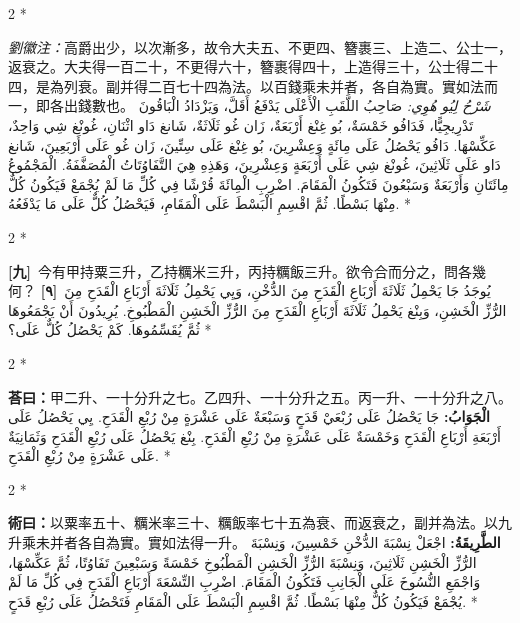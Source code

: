 \documentclass[11pt,a4paper]{article}
\newcommand{\ar}[1]{\arabicfont\beginR #1\endR}
\newcommand{\problemnum}[1]{\textbf{[\ignorespaces#1\unskip]}}
\newenvironment{bilingual}{%
  \begin{paracol}{2}%
  \switchcolumn[0]*%
}{%
  \end{paracol}%
}
\newcommand{\cnline}[1]{\switchcolumn[0]\noindent #1 \switchcolumn[1]}
\newcommand{\arline}[1]{\noindent\ar{#1} \switchcolumn[0]*}
\newenvironment{prob bilingual}{%
  \begin{paracol}{2}%
  \switchcolumn[0]*%
}{%
  \end{paracol}%
  \vspace{0.3em}%
}
\begin{document}
\begin{bilingual}
\cnline{%
\textcolor{commentarycolor}{\small\textit{劉徽注：}}高爵出少，以次漸多，故令大夫五、不更四、簪裹三、上造二、公士一，返衰之。大夫得一百二十，不更得六十，簪裹得四十，上造得三十，公士得二十四，是為列衰。副并得二百七十四為法。以百錢乘未并者，各自為實。實如法而一，即各出錢數也。
}
\arline{%
\textcolor{commentarycolor}{\small\textit{شَرْحُ لِيُو هُوِي:}} صَاحِبُ اللَّقَبِ الْأَعْلَى يَدْفَعُ أَقَلَّ، وَيَزْدَادُ الْبَاقُونَ تَدْرِيجِيًّا، فَدَافُو خَمْسَةٌ، بُو غِنْغ أَرْبَعَةٌ، زَان غُو ثَلَاثَةٌ، شَانغ دَاو اثْنَانِ، غُونْغ شِي وَاحِدٌ، عَكِّسْهَا. دَافُو يَحْصُلُ عَلَى مِائَةٍ وَعِشْرِينَ، بُو غِنْغ عَلَى سِتِّينَ، زَان غُو عَلَى أَرْبَعِينَ، شَانغ دَاو عَلَى ثَلَاثِينَ، غُونْغ شِي عَلَى أَرْبَعَةٍ وَعِشْرِينَ، وَهَذِهِ هِيَ التَّفَاوُتَاتُ الْمُصَفَّفَةُ. الْمَجْمُوعُ مِائَتَانِ وَأَرْبَعَةٌ وَسَبْعُونَ فَتَكُونُ الْمَقَامَ. اضْرِبِ الْمِائَةَ قُرْشًا فِي كُلِّ مَا لَمْ يُجْمَعْ فَيَكُونُ كُلٌّ مِنْهَا بَسْطًا. ثُمَّ اقْسِمِ الْبَسْطَ عَلَى الْمَقَامِ، فَيَحْصُلُ كُلٌّ عَلَى مَا يَدْفَعُهُ.
}
\end{bilingual}

\begin{bilingual}
\cnline{\problemnum{九}\, 今有甲持粟三升，乙持糲米三升，丙持糲飯三升。欲令合而分之，問各幾何？}
\arline{\problemnum{٩}\, يُوجَدُ جَا يَحْمِلُ ثَلَاثَةَ أَرْبَاعِ الْقَدَحِ مِنَ الدُّخْنِ، وَيِي يَحْمِلُ ثَلَاثَةَ أَرْبَاعِ الْقَدَحِ مِنَ الرُّزِّ الْخَشِنِ، وَبِنْغ يَحْمِلُ ثَلَاثَةَ أَرْبَاعِ الْقَدَحِ مِنَ الرُّزِّ الْخَشِنِ الْمَطْبُوخِ. يُرِيدُونَ أَنْ يَجْمَعُوهَا ثُمَّ يُقَسِّمُوهَا. كَمْ يَحْصُلُ كُلٌّ عَلَى؟}
\end{bilingual}

\begin{bilingual}
\cnline{\textcolor{answercolor}{\textbf{荅曰：}}甲二升、一十分升之七。乙四升、一十分升之五。丙一升、一十分升之八。}
\arline{\textcolor{answercolor}{\textbf{الْجَوَابُ:}} جَا يَحْصُلُ عَلَى رُبْعَيْ قَدَحٍ وَسَبْعَةٌ عَلَى عَشْرَةٍ مِنْ رُبْعِ الْقَدَحِ. يِي يَحْصُلُ عَلَى أَرْبَعَةِ أَرْبَاعِ الْقَدَحِ وَخَمْسَةٌ عَلَى عَشْرَةٍ مِنْ رُبْعِ الْقَدَحِ. بِنْغ يَحْصُلُ عَلَى رُبْعِ الْقَدَحِ وَثَمَانِيَةٌ عَلَى عَشْرَةٍ مِنْ رُبْعِ الْقَدَحِ.}
\end{bilingual}

\begin{bilingual}
\cnline{%
\textcolor{methodcolor}{\textbf{術曰：}}以粟率五十、糲米率三十、糲飯率七十五為衰、而返衰之，副并為法。以九升乘未并者各自為實。實如法得一升。
}
\arline{%
\textcolor{methodcolor}{\textbf{الطَّرِيقَةُ:}} اجْعَلْ نِسْبَةَ الدُّخْنِ خَمْسِينَ، وَنِسْبَةَ الرُّزِّ الْخَشِنِ ثَلَاثِينَ، وَنِسْبَةَ الرُّزِّ الْخَشِنِ الْمَطْبُوخِ خَمْسَةً وَسَبْعِينَ تَفَاوُتًا، ثُمَّ عَكِّسْهَا، وَاجْمَعِ النُّسُوخَ عَلَى الْجَانِبِ فَتَكُونُ الْمَقَامَ. اضْرِبِ التِّسْعَةَ أَرْبَاعِ الْقَدَحِ فِي كُلِّ مَا لَمْ يُجْمَعْ فَيَكُونُ كُلٌّ مِنْهَا بَسْطًا. ثُمَّ اقْسِمِ الْبَسْطَ عَلَى الْمَقَامِ فَتَحْصُلُ عَلَى رُبْعِ قَدَحٍ.
}
\end{bilingual}
\end{document}
